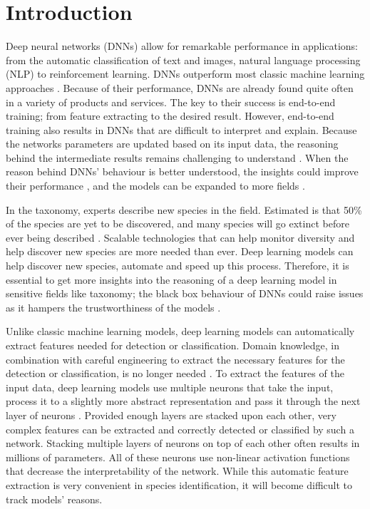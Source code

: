 \documentclass[a4paper, 12pt, oneside]{book} %
\begin{document}
\section{Introduction}
Deep neural networks (DNNs) allow for remarkable performance in applications: from the automatic classification of text and images, natural language processing (NLP) to reinforcement learning.
DNNs outperform most classic machine learning approaches \autocite{he_delving_2015, brown_language_2020}.
Because of their performance, DNNs are already found quite often in a variety of products and services.
The key to their success is end-to-end training; from feature extracting to the desired result.
However, end-to-end training also results in DNNs that are difficult to interpret and explain.
Because the networks parameters are updated based on its input data, the reasoning behind the intermediate results remains challenging to understand \autocite{li_interpretable_2021, losch_interpretability_2019}.
When the reason behind DNNs' behaviour is better understood, the insights could improve their performance \autocite{amershi_modeltracker_2015}, and the models can be expanded to more fields \autocite{lei_opening_2018}.

In the taxonomy, experts describe new species in the field.
Estimated is that 50\% of the species are yet to be discovered, and many species will go extinct before ever being described \autocite{lees_species_2015}.
Scalable technologies that can help monitor diversity and help discover new species are more needed than ever.
Deep learning models can help discover new species, automate and speed up this process.
Therefore, it is essential to get more insights into the reasoning of a deep learning model in sensitive fields like taxonomy; the black box behaviour of DNNs could raise issues as it hampers the trustworthiness of the models \autocite{carvalho_machine_2019}.

Unlike classic machine learning models, deep learning models can automatically extract features needed for detection or classification.
Domain knowledge, in combination with careful engineering to extract the necessary features for the detection or classification, is no longer needed \autocite{lecun_deep_2015}.
To extract the features of the input data, deep learning models use multiple neurons that take the input, process it to a slightly more abstract representation and pass it through the next layer of neurons \autocite{schmidhuber_deep_2015}.
Provided enough layers are stacked upon each other, very complex features can be extracted and correctly detected or classified by such a network.
Stacking multiple layers of neurons on top of each other often results in millions of parameters.
All of these neurons use non-linear activation functions that decrease the interpretability of the network.
While this automatic feature extraction is very convenient in species identification, it will become difficult to track models' reasons.
\end{document}
